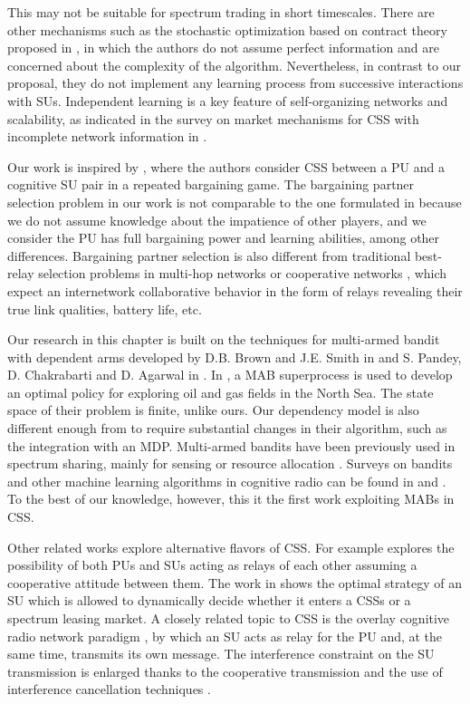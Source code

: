 This may not be suitable for spectrum trading in short timescales. There are other mechanisms such as the stochastic optimization based on contract theory proposed in \cite{ref:Duan2014}, in which the authors do not assume perfect information and are concerned about the complexity of the algorithm. Nevertheless, in contrast to our proposal, they do not implement any learning process from successive interactions with SUs. Independent learning is a key feature of self-organizing networks and scalability, as indicated in the survey on market mechanisms for CSS with incomplete network information in \cite{ref:Huang2013}.

Our work is inspired by \cite{ref:Yan2013}, where the authors consider CSS between a PU and a cognitive SU pair in a repeated bargaining game. 
The bargaining partner selection problem in our work is not comparable to the one formulated in \cite{ref:Calvo2002} because we do not assume knowledge about the impatience of other players, and we consider the PU has full bargaining power and learning abilities, among other differences. 
Bargaining partner selection is also different from traditional best-relay selection problems in multi-hop networks or cooperative networks \cite{ref:Yuan2013,ref:Tran2014}, which expect an internetwork collaborative behavior in the form of relays revealing their true link qualities, battery life, etc.

Our research in this chapter is built on the techniques for multi-armed bandit with dependent arms developed by D.B. Brown and J.E. Smith in \cite{ref:Brown2013} and S. Pandey, D. Chakrabarti and D. Agarwal in \cite{ref:Pandey2007}. In \cite{ref:Brown2013}, a MAB superprocess is used to develop an optimal policy for exploring oil and gas fields in the North Sea. The state space of their problem is finite, unlike ours. 
Our dependency model is also different enough from \cite{ref:Pandey2007} to require substantial changes in their algorithm, such as the integration with an MDP. 
Multi-armed bandits have been previously used in spectrum sharing, mainly for sensing or resource allocation \cite{ref:Si2010}. 
Surveys on bandits and other machine learning algorithms in cognitive radio can be found in \cite{ref:Bkassiny2013} and \cite{ref:Gavrilovska2013}.
To the best of our knowledge, however, this it the first work exploiting MABs in CSS. 

Other related works explore alternative flavors of CSS. For example \cite{ref:Tran2014} explores the possibility of both PUs and SUs acting as relays of each other assuming a cooperative attitude between them. 
The work in \cite{ref:Shao2014} shows the optimal strategy of an SU which is allowed to dynamically decide whether it enters a CSSs or a spectrum leasing market. A closely related topic to CSS is the overlay cognitive radio network paradigm \cite{ref:Goldsmith2009}, by which an SU acts as relay for the PU and, at the same time, transmits its own message. 
The interference constraint on the SU transmission is enlarged thanks to the cooperative transmission and the use of interference cancellation techniques \cite{ref:Han2010}. 

